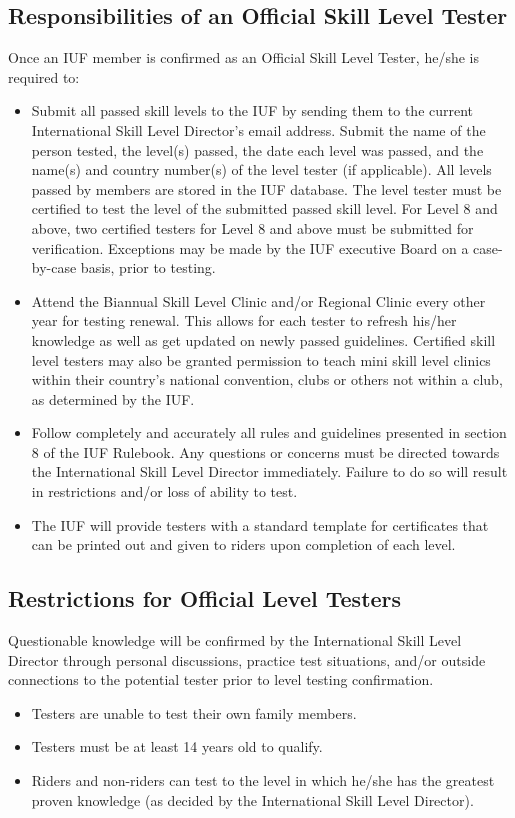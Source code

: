 \subsection{Responsibilities of an Official Skill Level Tester}
Once an IUF member is confirmed as an Official Skill Level Tester, he/she is required to:\\
\begin{itemize}
\item Submit all passed skill levels to the IUF by sending them to the current International Skill Level Director's email
address. Submit the name of the person tested, the level(s) passed, the date each level was passed, and the
name(s) and country number(s) of the level tester (if applicable). All levels passed by members are stored in the
IUF database. The level tester must be certified to test the level of the submitted passed skill level. For Level 8
and above, two certified testers for Level 8 and above must be submitted for verification. Exceptions may be
made by the IUF executive Board on a case-by-case basis, prior to testing.
\item Attend the Biannual Skill Level Clinic and/or Regional Clinic every other year for testing renewal. This allows for
each tester to refresh his/her knowledge as well as get updated on newly passed guidelines. Certified skill level
testers may also be granted permission to teach mini skill level clinics within their country's national convention,
clubs or others not within a club, as determined by the IUF.
\item Follow completely and accurately all rules and guidelines presented in section 8 of the IUF Rulebook. Any
questions or concerns must be directed towards the International Skill Level Director immediately. Failure to do
so will result in restrictions and/or loss of ability to test.
\item The IUF will provide testers with a standard template for certificates that can be printed out and given to riders
upon completion of each level.
\end{itemize}

\subsection{ Restrictions for Official Level Testers}
Questionable knowledge will be confirmed by the International Skill Level Director through personal discussions,
practice test situations, and/or outside connections to the potential tester prior to level testing confirmation.\\
\begin{itemize}
\item Testers are unable to test their own family members.
\item Testers must be at least 14 years old to qualify.
\item Riders and non-riders can test to the level in which he/she has the greatest proven knowledge (as decided by the
International Skill Level Director).
\end{itemize}

